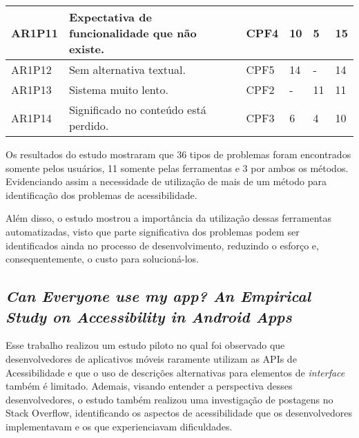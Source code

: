 \begin{table}[htb]
\begin{center}
\begin{tabular}{p{1.2cm}|p{8.7cm}|p{1.4cm}|p{0.6cm}|p{0.6cm}|p{0.7cm}}
      \hline
      AR1P11          & Expectativa de funcionalidade que não existe.                            & CPF4               & 10           & 5            & 15             \\
      \hline
      AR1P12          & Sem alternativa textual.                                                 & CPF5               & 14           & -            & 14             \\
      \hline
      AR1P13          & Sistema muito lento.                                                     & CPF2               & -            & 11           & 11             \\
      \hline
      AR1P14          & Significado no conteúdo está perdido.                                    & CPF3               & 6            & 4            & 10             \\
    \end{tabular}
  \end{center}
\end{table}

Os resultados do estudo mostraram que 36 tipos de problemas foram encontrados somente pelos usuários, 11 somente pelas ferramentas
e 3 por ambos os métodos. Evidenciando assim a necessidade de utilização de mais de um método para identificação dos problemas de
acessibilidade.

Além disso, o estudo mostrou a importância da utilização dessas ferramentas automatizadas, visto que parte significativa dos problemas
podem ser identificados ainda no processo de desenvolvimento, reduzindo o esforço e, consequentemente, o custo para solucioná-los.

\subsection{\emph{Can Everyone use my app? An Empirical Study on Accessibility in Android Apps}}

Esse trabalho realizou um estudo piloto no qual foi observado que desenvolvedores de aplicativos móveis raramente utilizam as APIs de Acessibilidade e que o uso de descrições alternativas para elementos de \emph{interface} também é limitado.
Ademais, visando entender a perspectiva desses desenvolvedores, o estudo também realizou uma investigação de postagens no Stack Overflow, identificando os aspectos de acessibilidade que os desenvolvedores implementavam e os que experienciavam dificuldades.

